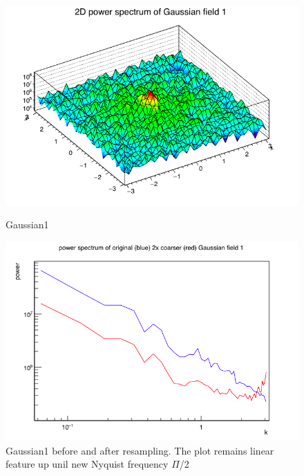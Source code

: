 \begin{figure}[!htbp]
\centering
\begin{minipage}{.5\textwidth}
  \centering
  \includegraphics[width=1\linewidth]{gaus1color}
  \caption{Gaussian1}
  \label{1col}
  
\end{minipage}%
\begin{minipage}{.5\textwidth}
  \centering
  \includegraphics[width=1.1\linewidth]{2BC1}
  \caption{Gaussian1 before and after resampling. The plot remains linear feature up unil new Nyquist frequency $\Pi$/2}
  \label{2BC1}
\end{minipage}
\end{figure}

